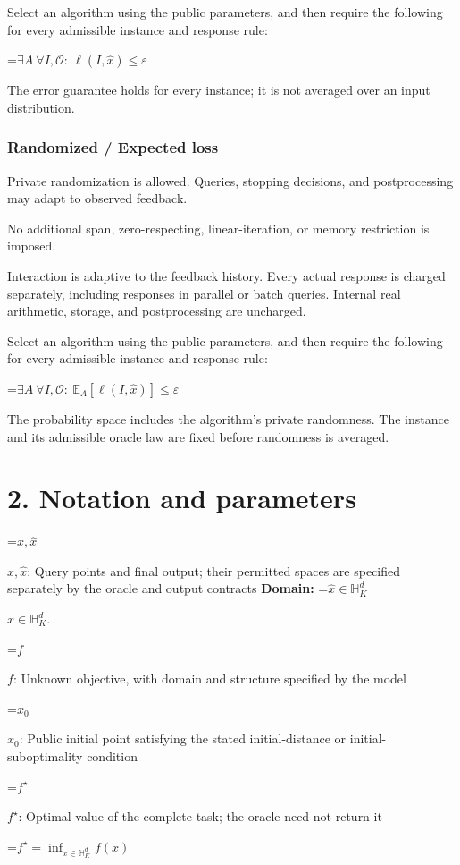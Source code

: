 \documentclass[10pt,a4paper]{article}
\newcommand{\AtlasMath}[1]{\par\begingroup\centering\setbox0=\hbox{$\displaystyle #1$}\ifdim\wd0>1.4\linewidth\typeout{ATLAS WIDE FORMULA: \the\wd0}\fi\ifdim\wd0>\linewidth\resizebox{\linewidth}{!}{\box0}\else\box0\fi\par\endgroup}
\newcommand{\AtlasInlineMath}[1]{\begingroup\setbox0=\hbox{$#1$}\ifdim\wd0>.4\linewidth\endgroup\AtlasMath{#1}\else\endgroup$#1$\fi}
\begin{document}
Select an algorithm using the public parameters, and then require the following for every admissible instance and response rule:


\AtlasMath{\exists A\ \forall I,\mathcal{O}:\ \ell(I,\widehat{x})\le\varepsilon}


The error guarantee holds for every instance; it is not averaged over an input distribution.

\subsubsection{Randomized / Expected loss}
Private randomization is allowed. Queries, stopping decisions, and postprocessing may adapt to observed feedback.

No additional span, zero-respecting, linear-iteration, or memory restriction is imposed.

Interaction is adaptive to the feedback history. Every actual response is charged separately, including responses in parallel or batch queries. Internal real arithmetic, storage, and postprocessing are uncharged.

Select an algorithm using the public parameters, and then require the following for every admissible instance and response rule:


\AtlasMath{\exists A\ \forall I,\mathcal{O}:\ \mathbb{E}_A[\ell(I,\widehat{x})]\le\varepsilon}


The probability space includes the algorithm's private randomness. The instance and its admissible oracle law are fixed before randomness is averaged.

\section{2. Notation and parameters}
\AtlasInlineMath{x,\widehat{x}}: Query points and final output; their permitted spaces are specified separately by the oracle and output contracts \textbf{Domain:} \AtlasInlineMath{\widehat{x}\in \mathbb{H}_K^d}.

\AtlasInlineMath{f}: Unknown objective, with domain and structure specified by the model

\AtlasInlineMath{x_0}: Public initial point satisfying the stated initial-distance or initial-suboptimality condition

\AtlasInlineMath{f^\star}: Optimal value of the complete task; the oracle need not return it


\AtlasMath{f^\star=\inf_{x\in \mathbb{H}_K^d}f(x)}
\end{document}
